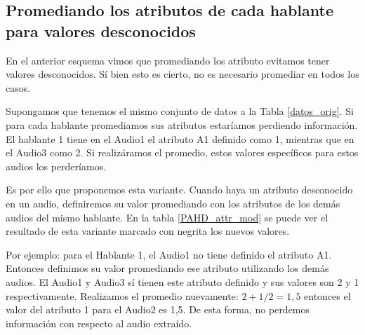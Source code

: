 \subsection{Promediando los atributos de cada hablante para valores desconocidos}
\label{prom_los_atributos_de_cada_hablante_para_valores_desconocidos}

En el anterior esquema vimos que promediando los atributo evitamos tener valores desconocidos. Sí bien esto es cierto, no es necesario promediar en todos los casos. 

Supongamos que tenemos el mismo conjunto de datos a la Tabla \ref{datos_orig}. Si para cada hablante promediamos sus atributos estaríamos perdiendo información. El hablante 1 tiene en el Audio1 el atributo A1 definido como 1, mientras que en el Audio3 como 2. Si realizáramos el promedio, estos valores específicos para estos audios los perderíamos.


Es por ello que proponemos esta variante. Cuando haya un atributo desconocido en un audio, definiremos su valor promediando con los atributos de los demás audios del mismo hablante. En la tabla \ref{PAHD_attr_mod} se puede ver el resultado de esta variante marcado con negrita los nuevos valores. 

Por ejemplo: para el Hablante 1, el Audio1 no tiene definido el atributo A1. Entonces definimos su valor promediando ese atributo utilizando los demás audios. El Audio1 y Audio3 sí tienen este atributo definido y sus valores son 2 y 1 respectivamente. Realizamos el promedio nuevamente: $ 2 + 1 / 2 = 1,5$ entonces el valor del atributo 1 para el Audio2 es 1,5. De esta forma, no perdemos información con respecto al audio extraído.

